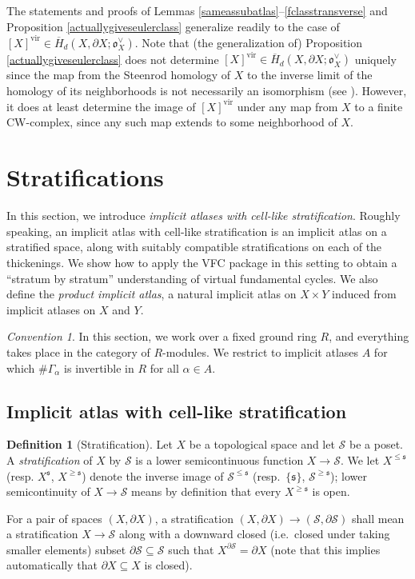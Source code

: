 \documentclass[12pt]{article}
\theoremstyle{definition}
\newtheorem{definition}[theorem]{Definition}
\theoremstyle{remark}
\newtheorem{convention}[theorem]{Convention}
\numberwithin{equation}{subsection}
\newcommand{\s}{\mathfrak s}
\newcommand{\oo}{\mathfrak o}
\newcommand{\SSS}{\mathcal S}
\newcommand{\sH}{\overline H}
\newcommand{\vir}{\mathrm{vir}}
\begin{document}
The statements and proofs of Lemmas \ref{sameassubatlas}--\ref{fclasstransverse} and Proposition \ref{actuallygiveseulerclass} generalize readily to the case of $[X]^\vir\in\sH_d(X,\partial X;\oo_X^\vee)$.  Note that (the generalization of) Proposition \ref{actuallygiveseulerclass} does not determine $[X]^\vir\in\sH_d(X,\partial X;\oo_X^\vee)$ uniquely since the map from the Steenrod homology of $X$ to the inverse limit of the homology of its neighborhoods is not necessarily an isomorphism (see \cite[p87, Theorem 4]{milnor}).  However, it does at least determine the image of $[X]^\vir$ under any map from $X$ to a finite CW-complex, since any such map extends to some neighborhood of $X$.

\section{Stratifications}\label{auxiliarysection}

In this section, we introduce \emph{implicit atlases with cell-like stratification}.  Roughly speaking, an implicit atlas with cell-like stratification is an implicit atlas on a stratified space, along with suitably compatible stratifications on each of the thickenings.  We show how to apply the VFC package in this setting to obtain a ``stratum by stratum'' understanding of virtual fundamental cycles.  We also define the \emph{product implicit atlas}, a natural implicit atlas on $X\times Y$ induced from implicit atlases on $X$ and $Y$.

\begin{convention}
In this section, we work over a fixed ground ring $R$, and everything takes place in the category of $R$-modules.  We restrict to implicit atlases $A$ for which $\#\Gamma_\alpha$ is invertible in $R$ for all $\alpha\in A$.
\end{convention}

\subsection{Implicit atlas with cell-like stratification}\label{stratifiedIAsec}

\begin{definition}[Stratification]\label{stratificationdefinition}
Let $X$ be a topological space and let $\SSS$ be a poset.  A \emph{stratification} of $X$ by $\SSS$ is a lower semicontinuous function $X\to\SSS$.  We let $X^{\leq\s}$ (resp. $X^\s$, $X^{\geq\s}$) denote the inverse image of $\SSS^{\leq\s}$ (resp.\ $\{\s\}$, $\SSS^{\geq\s}$); lower semicontinuity of $X\to\SSS$ means by definition that every $X^{\geq\s}$ is open.

For a pair of spaces $(X,\partial X)$, a stratification $(X,\partial X)\to(\SSS,\partial\SSS)$ shall mean a stratification $X\to\SSS$ along with a downward closed (i.e.\ closed under taking smaller elements) subset $\partial\SSS\subseteq\SSS$ such that $X^{\partial\SSS}=\partial X$ (note that this implies automatically that $\partial X\subseteq X$ is closed).
\end{definition}
\end{document}

